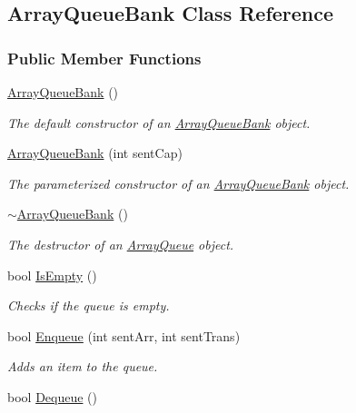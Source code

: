 \hypertarget{class_array_queue_bank}{}\subsection{Array\+Queue\+Bank Class Reference}
\label{class_array_queue_bank}
\subsubsection*{Public Member Functions}
\begin{DoxyCompactItemize}
\item 
\hyperlink{class_array_queue_bank_ac1d9cd36043a7c3c10d674abcfa2bb3a}{Array\+Queue\+Bank} ()
\begin{DoxyCompactList}\small\item\em The default constructor of an \hyperlink{class_array_queue_bank}{Array\+Queue\+Bank} object. \end{DoxyCompactList}\item 
\hyperlink{class_array_queue_bank_aad802c6b368bd661ad840a4c47f47894}{Array\+Queue\+Bank} (int sent\+Cap)
\begin{DoxyCompactList}\small\item\em The parameterized constructor of an \hyperlink{class_array_queue_bank}{Array\+Queue\+Bank} object. \end{DoxyCompactList}\item 
\hyperlink{class_array_queue_bank_a31ffe0d98cd8efc670609a80e0bbe395}{$\sim$\+Array\+Queue\+Bank} ()
\begin{DoxyCompactList}\small\item\em The destructor of an \hyperlink{class_array_queue}{Array\+Queue} object. \end{DoxyCompactList}\item 
bool \hyperlink{class_array_queue_bank_a1eabb2bce997efc7cc5c6686a2d18a03}{Is\+Empty} ()
\begin{DoxyCompactList}\small\item\em Checks if the queue is empty. \end{DoxyCompactList}\item 
bool \hyperlink{class_array_queue_bank_a8c6fd1fefdd15b031f11a18287edafaa}{Enqueue} (int sent\+Arr, int sent\+Trans)
\begin{DoxyCompactList}\small\item\em Adds an item to the queue. \end{DoxyCompactList}\item 
bool \hyperlink{class_array_queue_bank_aa75dc1d60283bfb66ce3149196a484ac}{Dequeue} ()

\end{DoxyCompactItemize}
